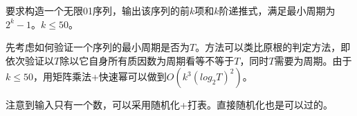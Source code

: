 \begin{prob}
	要求构造一个无限01序列，输出该序列的前$k$项和$k$阶递推式，满足最小周期为$2^k-1$。$k \le 50$。
\end{prob}

\begin{sol}
	先考虑如何验证一个序列的最小周期是否为$T$。方法可以类比原根的判定方法，即依次验证以$T$除以它自身所有质因数为周期看等不等于$T$，同时$T$需要为周期。由于$k \le 50$，用矩阵乘法+快速幂可以做到$O(k^3(log_2T)^2)$。
	\par 注意到输入只有一个数，可以采用随机化+打表。直接随机化也是可以过的。
\end{sol}
